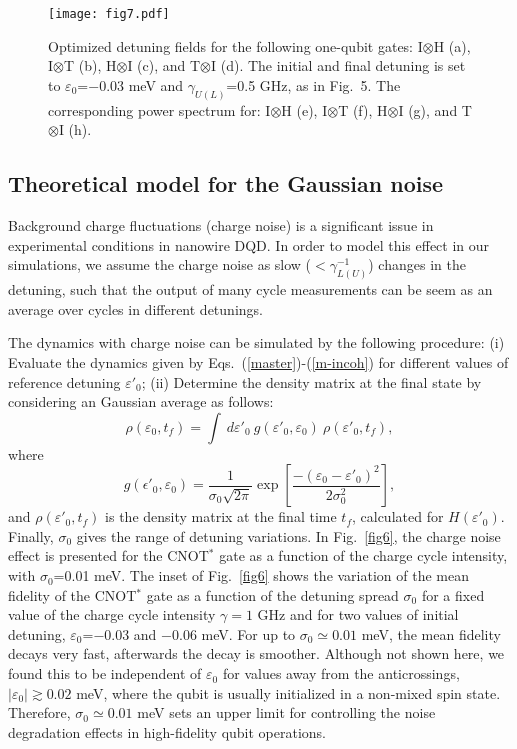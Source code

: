 \documentclass[prb,twocolumn,showpacs,floats]{revtex4}
\begin{document}
\begin{figure}[htbp]
\texttt{[image: fig7.pdf]} 
\caption{Optimized detuning fields for the following one-qubit gates: I$\otimes$H (a), I$\otimes$T (b),  H$\otimes$I (c), and T$\otimes$I (d). The initial and final detuning is set to $\varepsilon_0$=$-$0.03 meV
 and $\gamma_{U(L)}$=0.5 GHz, as in Fig.~5. The corresponding power spectrum for: I$\otimes$H (e), I$\otimes$T (f),  H$\otimes$I (g), and T$\otimes$I (h).}
\label{fig7}
\end{figure}


\subsection{ Theoretical model for the Gaussian noise}

Background charge fluctuations (charge noise) is a significant issue in
experimental conditions in nanowire DQD.\cite{petta-prl}
In order to model this effect in our simulations, we assume the 
charge noise as slow ($<\gamma_{L(U)}^{-1}$) changes in the detuning,
such that the output of many cycle measurements can be seem as
an average over cycles in different detunings.

The dynamics with charge noise can be simulated by the following procedure:
 (i) Evaluate the dynamics given by Eqs.~(\ref{master})-(\ref{m-incoh}) for different
values of reference detuning $\varepsilon'_0$; (ii) Determine the density matrix at the final state by considering an Gaussian average as follows:
\begin{equation}
\rho(\varepsilon_0,t_f) = \int ~ d\varepsilon'_0~ g(\varepsilon'_0,\varepsilon_0)  ~\rho(\varepsilon'_0,t_f), 
\label{master4}
\end{equation}
where
\begin{equation}
g(\epsilon'_0,\varepsilon_0) = \frac{1}{\sigma_0 \sqrt{2 \pi} } \exp{ \left[ 
\frac{-( \varepsilon_0 - \varepsilon'_0 )^2}{2 \sigma_0^2} \right] }, 
\label{av1}
\end{equation}
and $\rho(\varepsilon'_0,t_f)$ is the density matrix at the final time $t_f$, 
calculated for $H (\varepsilon'_0)$. Finally, $\sigma_0$ gives the range of detuning variations. In Fig.~\ref{fig6}, the charge noise effect is presented for the CNOT$^*$ gate as a function of the charge cycle intensity, with $\sigma_0$=0.01 meV.
The inset of Fig.~\ref{fig6} shows the variation of the mean fidelity of the CNOT$^*$ gate 
as a function of the detuning spread $\sigma_0$ for a fixed value of the charge cycle intensity $\gamma=1$ GHz and for two values of initial detuning,  $\varepsilon_0$=$-$0.03 and $-$0.06 meV.
 For up to $\sigma_0 \simeq 0.01$ meV, the mean fidelity decays very fast, afterwards the decay is smoother.
 Although not shown here, we found this to be independent of  $\varepsilon_0$ for values away from the anticrossings, $|\varepsilon_0| \gtrsim 0.02$ meV, where the qubit is usually initialized in a non-mixed
 spin state. Therefore,  $\sigma_0 \simeq 0.01$ meV sets an upper limit for controlling the noise degradation effects in high-fidelity qubit operations.
\end{document}
